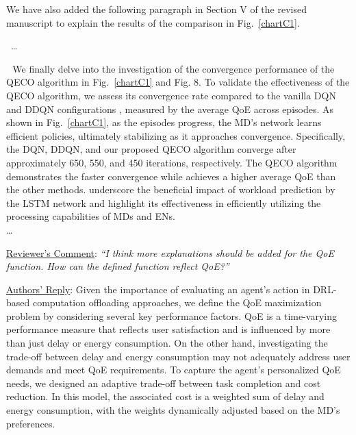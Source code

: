 \documentclass[12pt,draftclsnofoot,onecolumn]{IEEEtran}
\newcommand{\rev}[1]{{\color{blue}#1}} %
\newcommand{\rev}[1]{#1}
\newenvironment{my}[2]%
{\begin{list}{}%
{\setlength{\rightmargin}{#1}\setlength{\leftmargin}{#2}}%


 \item[]{}

} {\end{list}}
\begin{document}
\begin{enumerate}
We have also added the following paragraph in Section V of the revised manuscript to explain the results of the comparison in Fig.~\ref{chartC1}.
\begin{my}{1cm}{1cm}
	\rev{
		{\ 
			\dots 
			
			
			\,\,\,\,We finally delve into the investigation of the convergence performance of the QECO algorithm in Fig.~\ref{chartC1} and Fig. 8. To validate the effectiveness of the QECO algorithm, we assess its convergence rate compared to the vanilla DQN and DDQN configurations \cite{van2016deep}, measured by the average QoE across episodes. As shown in Fig.~\ref{chartC1}, as the episodes progress, the MD's network learns efficient policies, ultimately stabilizing as it approaches convergence. Specifically, the DQN, DDQN, and our proposed QECO algorithm converge after approximately 650, 550, and 450 iterations, respectively. The QECO algorithm demonstrates the faster convergence while achieves a higher average QoE than the other methods. underscore the beneficial impact of workload prediction by the LSTM network and highlight its effectiveness in efficiently utilizing the processing capabilities of  MDs and ENs. \\\dots }}
	
\end{my}

\vspace{6mm}




	\item \underline{Reviewer's Comment}: 
	\textit{``I think more explanations should be added for the QoE function. How can the defined function reflect QoE?''} \newline
	
	\underline{Authors' Reply}: Given the importance of evaluating an agent's action in DRL-based computation offloading approaches, we define the QoE maximization problem by considering several key performance factors. QoE is a time-varying performance measure that reflects user satisfaction and is influenced by more than just delay or energy consumption. On the other hand, investigating the trade-off between delay and energy consumption may not adequately address user demands and meet QoE requirements. To capture the agent’s personalized QoE needs, we designed an adaptive trade-off between task completion and cost reduction. In this model, the associated cost is a weighted sum of delay and energy consumption, with the weights dynamically adjusted based on the MD's preferences.\vspace{2mm}
	

\end{enumerate}
\end{document}
